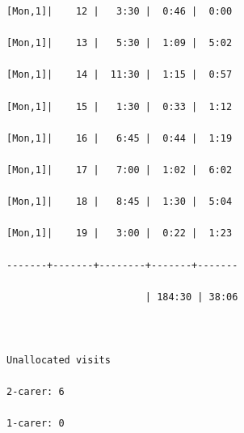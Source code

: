 \documentclass[11pt,twoside]{article}
\numberwithin{Theorem}{section}
\numberwithin{Definition}{section}
\numberwithin{Lemma}{section}
\numberwithin{Algorithm}{section}
\numberwithin{equation}{section}
\begin{document}
\begin{verbatim}
[Mon,1]|    12 |   3:30 |  0:46 |  0:00

[Mon,1]|    13 |   5:30 |  1:09 |  5:02

[Mon,1]|    14 |  11:30 |  1:15 |  0:57

[Mon,1]|    15 |   1:30 |  0:33 |  1:12

[Mon,1]|    16 |   6:45 |  0:44 |  1:19

[Mon,1]|    17 |   7:00 |  1:02 |  6:02

[Mon,1]|    18 |   8:45 |  1:30 |  5:04

[Mon,1]|    19 |   3:00 |  0:22 |  1:23

-------+-------+--------+-------+-------

                        | 184:30 | 38:06

 

Unallocated visits

2-carer: 6

1-carer: 0
\end{verbatim}
\end{document}
